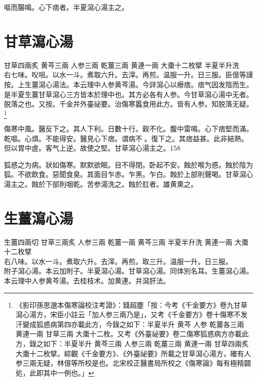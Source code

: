 嘔而腸鳴。心下痞者。半夏瀉心湯主之。

\section{甘草瀉心湯}

甘草{\scriptsize 四兩炙} 黄芩{\scriptsize 三兩} 人参{\scriptsize 三兩} 乾薑{\scriptsize 三兩} 黄連{\scriptsize 一兩} 大棗{\scriptsize 十二枚擘} 半夏{\scriptsize 半升洗}\\
右七味。㕮咀。以水一斗。煮取六升。去滓。再煎。温服一升。日三服。{\scriptsize 臣億等謹按。上生薑瀉心湯法。本云理中人参黄芩湯。今詳瀉心以療痞。痞气因发陰而生。是半夏生薑甘草瀉心三方皆本於理中也。其方必各有人参。今甘草瀉心湯中无者。脱落之也。又按。千金并外臺祕要。治傷寒䘌食用此方。皆有人参。知脱落无疑。}
	\footnote{
		《影印孫思邈本傷寒論校注考證》：錢超塵「按：今考《千金要方》卷九甘草瀉心湯方，宋臣小註云「加人参三兩乃是」，又考《千金要方》卷十傷寒不发汗變成狐惑病第四亦載此方，今錄之如下：半夏{\scriptsize 半升}{ }黄芩{ }人参{ }乾薑{\scriptsize 各三兩}{ }黄連{\scriptsize 一兩}{ }甘草{\scriptsize 三兩}{ }大棗{\scriptsize 十二枚}。又考《外臺祕要》卷二傷寒狐惑病方亦載此方，錄之如下：半夏{\scriptsize 半升}{ }黄芩{\scriptsize 三兩}{ }人参{\scriptsize 三兩}{ }乾薑{\scriptsize 三兩}{ }黄連{\scriptsize 一兩}{ }甘草{\scriptsize 四兩炙}{ }大棗{\scriptsize 十二枚擘}。綜觀《千金要方》、《外臺祕要》所載之甘草瀉心湯方，確有人参三兩无疑，林億等所校是也。北宋校正醫書局所校之《傷寒論》每有極精闢処，此即其中一例也。」
	}

傷寒中風。醫反下之。其人下利。日數十行。穀不化。腹中雷鳴。心下痞堅而滿。乾嘔。心煩。不{\khaaitp 能}得安。醫見心下痞。谓病不{\sungtpii 𥁞}。復下之。其痞益甚。此非結熱。但以胃中虗。客气上逆。故使之堅。甘草瀉心湯主之。158

狐惑之为病。狀如傷寒。默默欲眠。目不得閉。卧起不安。蝕於喉为惑。蝕於陰为狐。不欲飲食。惡聞食臭。其面目乍赤。乍黑。乍白。蝕於上部則聲喝。甘草瀉心湯主之。蝕於下部則咽乾。苦参湯洗之。蝕於肛者。雄黄熏之。

\section{生薑瀉心湯}

生薑{\scriptsize 四兩切} 甘草{\scriptsize 三兩炙} 人参{\scriptsize 三兩} 乾薑{\scriptsize 一兩} 黄芩{\scriptsize 三兩} 半夏{\scriptsize 半升洗} 黄連{\scriptsize 一兩} 大棗{\scriptsize 十二枚擘}\\
右八味。以水一斗。煮取六升。去滓。再煎。取三升。温服一升。日三服。\\
附子瀉心湯。本云加附子。半夏瀉心湯。甘草瀉心湯。同体別名耳。生薑瀉心湯。本云理中人参黄芩湯。去桂枝术。加黄連。并瀉肝法。


